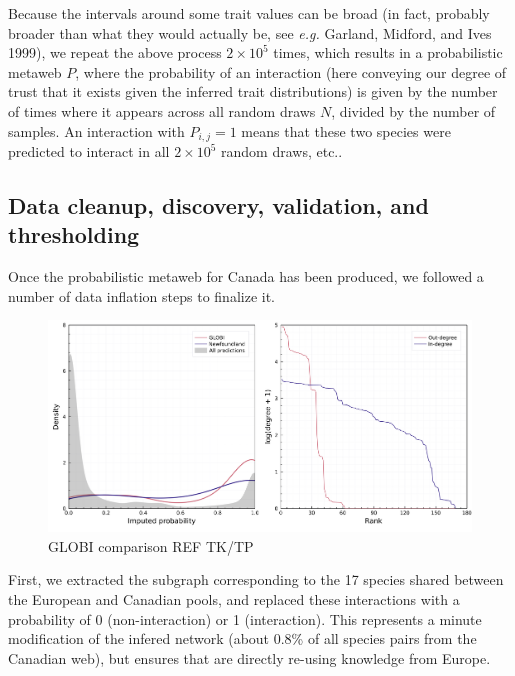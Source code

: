 \documentclass[11pt]{article}
\makeatletter
\def\maxwidth{\ifdim\Gin@nat@width>\linewidth\linewidth
\else\Gin@nat@width\fi}
\let\Oldincludegraphics\includegraphics
\renewcommand{\includegraphics}[1]{\Oldincludegraphics[width=\maxwidth]{#1}}
\makeatother
\begin{document}
Because the intervals around some trait values can be broad (in fact,
probably broader than what they would actually be, see \emph{e.g.}
Garland, Midford, and Ives 1999), we repeat the above process
\(2\times 10^5\) times, which results in a probabilistic metaweb \(P\),
where the probability of an interaction (here conveying our degree of
trust that it exists given the inferred trait distributions) is given by
the number of times where it appears across all random draws \(N\),
divided by the number of samples. An interaction with \(P_{i,j} = 1\)
means that these two species were predicted to interact in all
\(2\times 10^5\) random draws, etc..

\hypertarget{data-cleanup-discovery-validation-and-thresholding}{%
\subsection{Data cleanup, discovery, validation, and
thresholding}\label{data-cleanup-discovery-validation-and-thresholding}}

Once the probabilistic metaweb for Canada has been produced, we followed
a number of data inflation steps to finalize it.

\begin{figure}
\hypertarget{fig:inflation}{%
\centering
\includegraphics{figures/figure-validation.png}
\caption{GLOBI comparison REF TK/TP}\label{fig:inflation}
}
\end{figure}

First, we extracted the subgraph corresponding to the 17 species shared
between the European and Canadian pools, and replaced these interactions
with a probability of 0 (non-interaction) or 1 (interaction). This
represents a minute modification of the infered network (about 0.8\% of
all species pairs from the Canadian web), but ensures that are directly
re-using knowledge from Europe.
\end{document}
